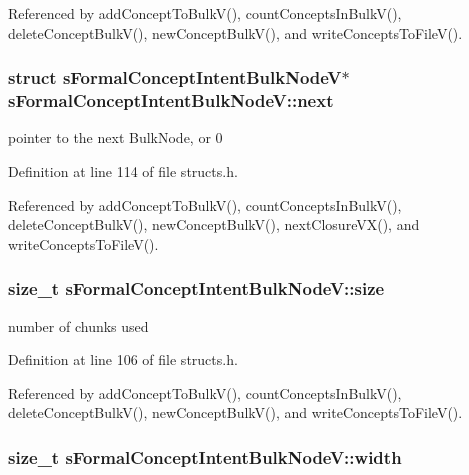\-Referenced by add\-Concept\-To\-Bulk\-V(), count\-Concepts\-In\-Bulk\-V(), delete\-Concept\-Bulk\-V(), new\-Concept\-Bulk\-V(), and write\-Concepts\-To\-File\-V().

\hypertarget{structsFormalConceptIntentBulkNodeV_ac2cd46a8c3334e2d2fdbc6c203707ed8}{
\subsubsection[{next}]{\setlength{\rightskip}{0pt plus 5cm}struct {\bf s\-Formal\-Concept\-Intent\-Bulk\-Node\-V}$\ast$ {\bf s\-Formal\-Concept\-Intent\-Bulk\-Node\-V\-::next}}}\label{structsFormalConceptIntentBulkNodeV_ac2cd46a8c3334e2d2fdbc6c203707ed8}


pointer to the next \-Bulk\-Node, or 0 



\-Definition at line 114 of file structs.\-h.



\-Referenced by add\-Concept\-To\-Bulk\-V(), count\-Concepts\-In\-Bulk\-V(), delete\-Concept\-Bulk\-V(), new\-Concept\-Bulk\-V(), next\-Closure\-V\-X(), and write\-Concepts\-To\-File\-V().

\hypertarget{structsFormalConceptIntentBulkNodeV_a516403c9da58b5bedbf72f0a037d5c4f}{
\subsubsection[{size}]{\setlength{\rightskip}{0pt plus 5cm}size\-\_\-t {\bf s\-Formal\-Concept\-Intent\-Bulk\-Node\-V\-::size}}}\label{structsFormalConceptIntentBulkNodeV_a516403c9da58b5bedbf72f0a037d5c4f}


number of chunks used 



\-Definition at line 106 of file structs.\-h.



\-Referenced by add\-Concept\-To\-Bulk\-V(), count\-Concepts\-In\-Bulk\-V(), delete\-Concept\-Bulk\-V(), new\-Concept\-Bulk\-V(), and write\-Concepts\-To\-File\-V().

\hypertarget{structsFormalConceptIntentBulkNodeV_ab6c271021365b30649e33b474862f5d8}{
\subsubsection[{width}]{\setlength{\rightskip}{0pt plus 5cm}size\-\_\-t {\bf s\-Formal\-Concept\-Intent\-Bulk\-Node\-V\-::width}}}\label{structsFormalConceptIntentBulkNodeV_ab6c271021365b30649e33b474862f5d8}


